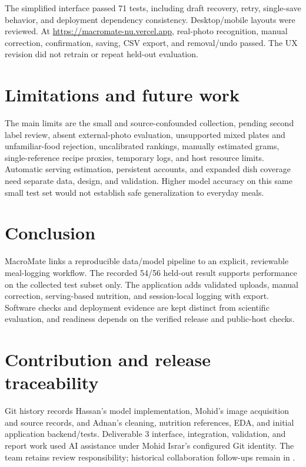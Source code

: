 \documentclass[11pt,a4paper]{article}
\newcommand{\code}[1]{\texttt{\detokenize{#1}}}
\begin{document}
The simplified interface passed 71 tests, including draft recovery, retry,
single-save behavior, and deployment dependency consistency. Desktop/mobile
layouts were reviewed. At \url{https://macromate-nu.vercel.app}, real-photo
recognition, manual correction, confirmation, saving, CSV export, and removal/undo
passed. The UX revision did not retrain or repeat held-out evaluation.

\section{Limitations and future work}
The main limits are the small and source-confounded collection, pending second
label review, absent external-photo evaluation, unsupported mixed plates and
unfamiliar-food rejection, uncalibrated rankings, manually estimated grams,
single-reference recipe proxies, temporary logs, and host resource limits.
Automatic serving estimation, persistent accounts, and expanded dish coverage
need separate data, design, and validation. Higher model accuracy on this same
small test set would not establish safe generalization to everyday meals.

\section{Conclusion}
MacroMate links a reproducible data/model pipeline to an explicit, reviewable
meal-logging workflow. The recorded 54/56 held-out result supports performance
on the collected test subset only. The application adds validated uploads,
manual correction, serving-based nutrition, and session-local logging with export.
Software checks and deployment evidence are kept distinct from scientific
evaluation, and readiness depends on the verified release and public-host checks.

\appendix
\section{Contribution and release traceability}
Git history records Hassan's model implementation, Mohid's image acquisition and
source records, and Adnan's cleaning, nutrition references, EDA, and initial
application backend/tests. Deliverable 3 interface, integration, validation, and
report work used AI assistance under Mohid Israr's configured Git identity.
The team retains review responsibility; historical collaboration follow-ups
remain in \code{docs/submission_checklist.md}.
\end{document}
